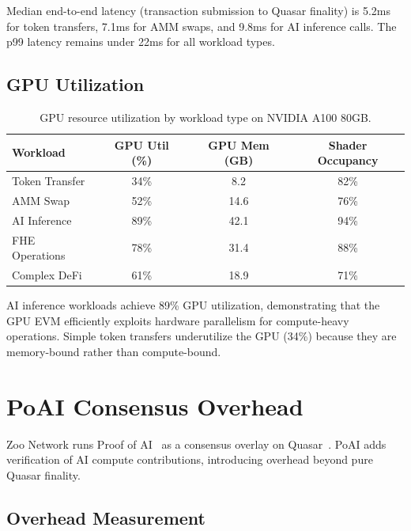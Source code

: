 \documentclass[11pt,letterpaper]{article}
\begin{document}
Median end-to-end latency (transaction submission to Quasar finality) is 5.2ms for token transfers, 7.1ms for AMM swaps, and 9.8ms for AI inference calls. The p99 latency remains under 22ms for all workload types.

\subsection{GPU Utilization}

\begin{table}[t]
\centering
\begin{tabular}{lccc}
\toprule
\textbf{Workload} & \textbf{GPU Util (\%)} & \textbf{GPU Mem (GB)} & \textbf{Shader Occupancy} \\
\midrule
Token Transfer & 34\% & 8.2 & 82\% \\
AMM Swap & 52\% & 14.6 & 76\% \\
AI Inference & 89\% & 42.1 & 94\% \\
FHE Operations & 78\% & 31.4 & 88\% \\
Complex DeFi & 61\% & 18.9 & 71\% \\
\bottomrule
\end{tabular}
\caption{GPU resource utilization by workload type on NVIDIA A100 80GB.}
\label{tab:gpu}
\end{table}

AI inference workloads achieve 89\% GPU utilization, demonstrating that the GPU EVM efficiently exploits hardware parallelism for compute-heavy operations. Simple token transfers underutilize the GPU (34\%) because they are memory-bound rather than compute-bound.

\section{PoAI Consensus Overhead}
\label{sec:poai}

Zoo Network runs Proof of AI~\cite{zoo-poai-consensus} as a consensus overlay on Quasar~\cite{lux-quasar-consensus}. PoAI adds verification of AI compute contributions, introducing overhead beyond pure Quasar finality.

\subsection{Overhead Measurement}
\end{document}
